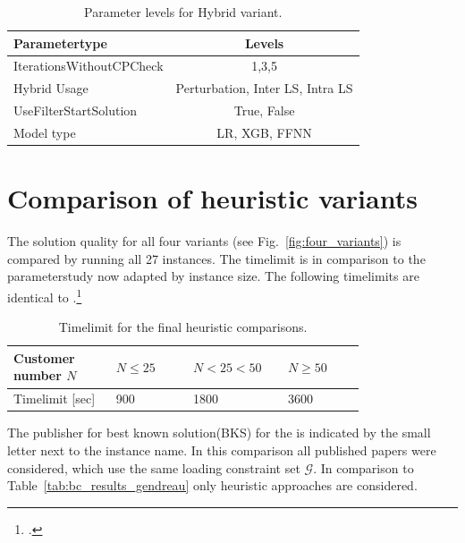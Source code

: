 \begin{table}[ht]
    \centering
    \def\arraystretch{1.2}
    \begin{tabular}{l c }
        \toprule
        Parametertype            & Levels                                       \\
        \midrule
        IterationsWithoutCPCheck & 1,3,5                                        \\
        Hybrid Usage             & Perturbation, Inter \gls{LS}, Intra \gls{LS} \\
        UseFilterStartSolution   & True, False                                  \\
        Model type               & \gls{LR}, \gls{XGB}, \gls{FFNN}              \\
        \bottomrule
    \end{tabular}
    \caption{Parameter levels for Hybrid variant.}
    \label{tab:parameters_hybrid}
\end{table}

\section{Comparison of heuristic variants}
\label{sec:comparison_ils_variants}

The solution quality for all four variants (see Fig.~\ref{fig:four_variants}) is compared by running all 27 instances.
The timelimit is in comparison to the parameterstudy now adapted by instance size. The following timelimits are identical
to \cite{zhang_evolutionary_2015}.\footcite[cf.][p.28]{zhang_evolutionary_2015}
\begin{table}[ht]
    \centering
    \begin{tabular}{C{0.24\linewidth}C{0.18\linewidth}C{0.18\linewidth}C{0.18\linewidth}}
        \toprule
        Customer number $N$ & $N \leq 25$ & $N < 25 < 50 $ & $N \geq 50 $ \\
        \midrule
        Timelimit [sec]     & 900         & 1800           & 3600         \\
        \bottomrule
    \end{tabular}
    \caption{Timelimit for the final heuristic comparisons.}
\end{table}

The publisher for best known solution(BKS) for the \gendreauDataSetText is indicated by the small letter
next to the instance name. In this comparison all published papers were considered, which use the same loading constraint set $\mathcal{G}$.
In comparison to Table~\ref{tab:bc_results_gendreau} only heuristic approaches are considered.

